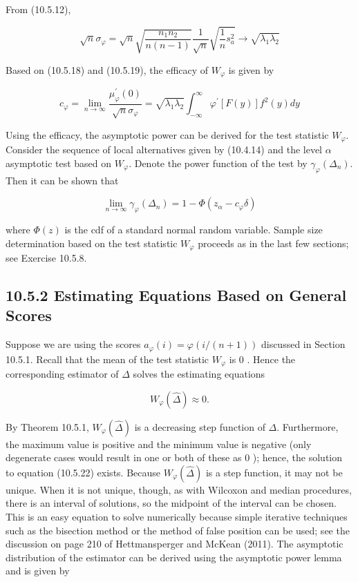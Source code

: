 From (10.5.12),


\begin{equation*}
\sqrt{n} \sigma_{\varphi}=\sqrt{n} \sqrt{\frac{n_{1} n_{2}}{n(n-1)}} \frac{1}{\sqrt{n}} \sqrt{\frac{1}{n} s_{a}^{2}} \rightarrow \sqrt{\lambda_{1} \lambda_{2}} \tag{10.5.19}
\end{equation*}


Based on (10.5.18) and (10.5.19), the efficacy of $W_{\varphi}$ is given by


\begin{equation*}
c_{\varphi}=\lim _{n \rightarrow \infty} \frac{\mu_{\varphi}^{\prime}(0)}{\sqrt{n} \sigma_{\varphi}}=\sqrt{\lambda_{1} \lambda_{2}} \int_{-\infty}^{\infty} \varphi^{\prime}[F(y)] f^{2}(y) d y \tag{10.5.20}
\end{equation*}


Using the efficacy, the asymptotic power can be derived for the test statistic $W_{\varphi}$. Consider the sequence of local alternatives given by (10.4.14) and the level $\alpha$ asymptotic test based on $W_{\varphi}$. Denote the power function of the test by $\gamma_{\varphi}\left(\Delta_{n}\right)$. Then it can be shown that


\begin{equation*}
\lim _{n \rightarrow \infty} \gamma_{\varphi}\left(\Delta_{n}\right)=1-\Phi\left(z_{\alpha}-c_{\varphi} \delta\right) \tag{10.5.21}
\end{equation*}


where $\Phi(z)$ is the cdf of a standard normal random variable. Sample size determination based on the test statistic $W_{\varphi}$ proceeds as in the last few sections; see Exercise 10.5.8.

\subsection*{10.5.2 Estimating Equations Based on General Scores}
Suppose we are using the scores $a_{\varphi}(i)=\varphi(i /(n+1))$ discussed in Section 10.5.1. Recall that the mean of the test statistic $W_{\varphi}$ is 0 . Hence the corresponding estimator of $\Delta$ solves the estimating equations


\begin{equation*}
W_{\varphi}(\widehat{\Delta}) \approx 0 . \tag{10.5.22}
\end{equation*}


By Theorem 10.5.1, $W_{\varphi}(\widehat{\Delta})$ is a decreasing step function of $\Delta$. Furthermore, the maximum value is positive and the minimum value is negative (only degenerate cases would result in one or both of these as 0 ); hence, the solution to equation (10.5.22) exists. Because $W_{\varphi}(\widehat{\Delta})$ is a step function, it may not be unique. When it is not unique, though, as with Wilcoxon and median procedures, there is an interval of solutions, so the midpoint of the interval can be chosen. This is an easy equation to solve numerically because simple iterative techniques such as the bisection method or the method of false position can be used; see the discussion on page 210 of Hettmansperger and McKean (2011). The asymptotic distribution of the estimator can be derived using the asymptotic power lemma and is given by


